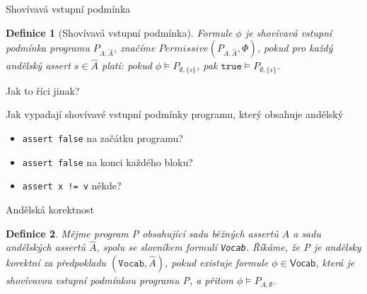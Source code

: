 \documentclass[11pt]{beamer}
\newtheorem{dfn}{Definice}
\begin{document}
\begin{frame}{Shovívavá vstupní podmínka}
\begin{dfn}[Shovívavá vstupní podmínka]
Formule $\phi$ je shovívavá vstupní podmínka programu $P_{A, \hat{A}}$,
značíme $Permissive\left( P_{A, \hat{A}}, \Phi \right)$,
pokud pro každý andělský assert $s \in \hat{A} $ platí:
pokud $\phi \vDash P_{\emptyset, \{ s \} }$, pak  $ \texttt{true} \vDash P_{\emptyset, \{ s \} } $.
\end{dfn}

\pause Jak to říci jinak?

\pause Jak vypadají shovívavé vstupní podmínky programu, který obsahuje andělský
\begin{itemize}
\pause \item \lstinline|assert false| na začátku programu?
\pause \item \lstinline|assert false| na konci každého bloku?
\pause \item \lstinline|assert x != v| někde?
\end{itemize}

\end{frame}

\begin{frame}{Andělská korektnost}
\begin{dfn}
Mějme program P obsahující sadu běžných assertů $A$
a sadu andělských assertů $\hat{A}$, spolu se slovníkem formulí \texttt{Vocab}.
Říkáme, že P je andělsky korektní za předpokladu $( \texttt{Vocab}, \hat{A} )$,
pokud existuje formule $\phi \in \textsf{Vocab}$, která je shovívavou vstupní podmínkou programu P,
a přitom $\phi \vDash P_{A, \emptyset}$. 
\end{dfn}
\end{frame}



\end{document}
